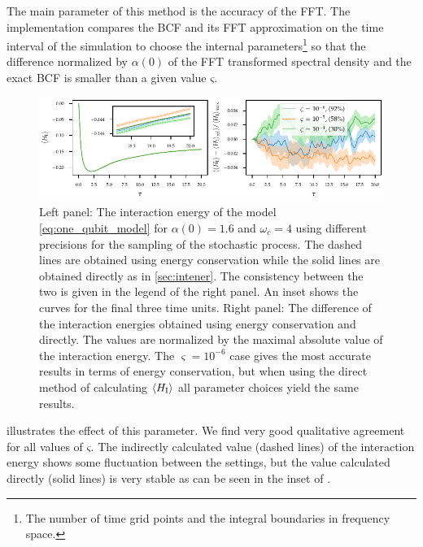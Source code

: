 The main parameter of this method is the accuracy of the FFT. The
implementation compares the BCF and its FFT approximation on the time
interval of the simulation to choose the internal
parameters\footnote{The number of time grid points and the integral
  boundaries in frequency space.} so that the difference normalized by
\(α(0)\) of the FFT transformed spectral density and the exact BCF is
smaller than a given value \(ς\).

\begin{figure}[htp]
  \centering
  \includegraphics{figs/one_bath_syst/stocproc_systematics_interaction}
  \caption{\label{fig:stocproc_systematics} Left panel: The
    interaction energy of the model \cref{eq:one_qubit_model} for
    \(α(0)=1.6\) and \(ω_c=4\) using different precisions for the
    sampling of the stochastic process. The dashed lines are obtained
    using energy conservation while the solid lines are obtained
    directly as in \cref{sec:intener}. The consistency between the two
    is given in the legend of the right panel. An inset shows the
    curves for the final three time units. Right panel: The difference
    of the interaction energies obtained using energy conservation and
    directly. The values are normalized by the maximal absolute value
    of the interaction energy. The \(\varsigma = 10^{-6}\) case gives
    the most accurate results in terms of energy conservation, but
    when using the direct method of calculating \(\ev{H_{\inter}}\)
    all parameter choices yield the same results.}
\end{figure}
 illustrates the effect of this
parameter. We find very good qualitative agreement for all values of
\(ς\). The indirectly calculated value (dashed lines) of the
interaction energy shows some fluctuation between the settings, but
the value calculated directly (solid lines) is very stable as can be
seen in the inset of .

